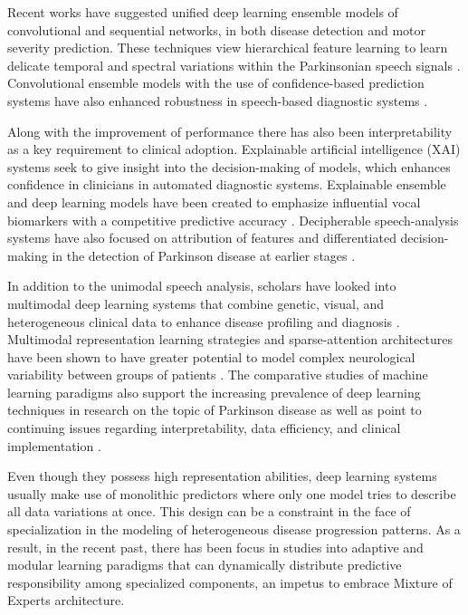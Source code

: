 \documentclass{customIEEEsingle}
\begin{document}
	Recent works have suggested unified deep learning ensemble models of convolutional and sequential networks, in both disease detection and motor severity prediction. These techniques view hierarchical feature learning to learn delicate temporal and spectral variations within the Parkinsonian speech signals \cite{khedimi-2025}. Convolutional ensemble models with the use of confidence-based prediction systems have also enhanced robustness in speech-based diagnostic systems \cite{titouni-2026}.
	
	Along with the improvement of performance there has also been interpretability as a key requirement to clinical adoption. Explainable artificial intelligence (XAI) systems seek to give insight into the decision-making of models, which enhances confidence in clinicians in automated diagnostic systems. Explainable ensemble and deep learning models have been created to emphasize influential vocal biomarkers with a competitive predictive accuracy \cite{aladhadh-2025}. Decipherable speech-analysis systems have also focused on attribution of features and differentiated decision-making in the detection of Parkinson disease at earlier stages \cite{simone-2025,xu-2025}.
	
	In addition to the unimodal speech analysis, scholars have looked into multimodal deep learning systems that combine genetic, visual, and heterogeneous clinical data to enhance disease profiling and diagnosis \cite{cao-2025}. Multimodal representation learning strategies and sparse-attention architectures have been shown to have greater potential to model complex neurological variability between groups of patients \cite{datta-2026}. The comparative studies of machine learning paradigms also support the increasing prevalence of deep learning techniques in research on the topic of Parkinson disease as well as point to continuing issues regarding interpretability, data efficiency, and clinical implementation \cite{chaithanya-2025,kumar-2025}.
	
	Even though they possess high representation abilities, deep learning systems usually make use of monolithic predictors where only one model tries to describe all data variations at once. This design can be a constraint in the face of specialization in the modeling of heterogeneous disease progression patterns. As a result, in the recent past, there has been focus in studies into adaptive and modular learning paradigms that can dynamically distribute predictive responsibility among specialized components, an impetus to embrace Mixture of Experts architecture.
	
\end{document}
